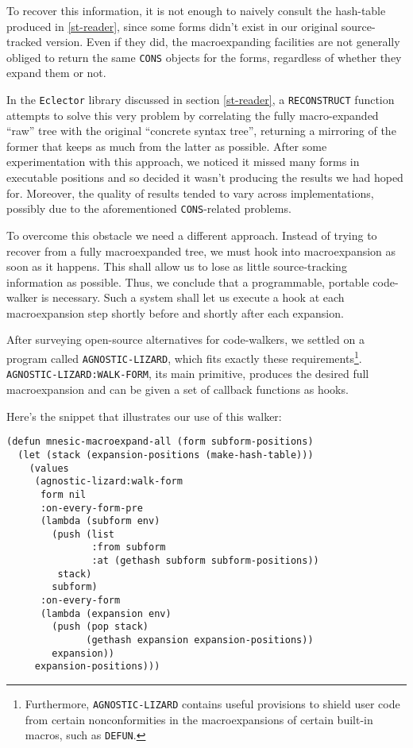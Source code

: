 \documentclass[format=sigconf]{acmart}
\begin{document}
To recover this information, it is not enough to naively consult the
hash-table produced in \ref{st-reader}, since some forms didn't exist
in our original source-tracked version.  Even if they did, the
macroexpanding facilities are not generally obliged to return the same
\texttt{CONS} objects for the forms, regardless of whether they expand
them or not.

In the \texttt{Eclector} library discussed in section \ref{st-reader},
a \texttt{RECONSTRUCT} function attempts to solve this very problem by
correlating the fully macro-expanded ``raw'' tree with the original
``concrete syntax tree'', returning a mirroring of the former that
keeps as much from the latter as possible.  After some experimentation
with this approach, we noticed it missed many forms in executable
positions and so decided it wasn't producing the results we had hoped
for.  Moreover, the quality of results tended to vary across
implementations, possibly due to the aforementioned
\texttt{CONS}-related problems.

To overcome this obstacle we need a different approach.  Instead of
trying to recover from a fully macroexpanded tree, we must hook into
macroexpansion as soon as it happens.  This shall allow us to lose as
little source-tracking information as possible.  Thus, we conclude
that a programmable, portable code-walker is necessary.  Such a system
shall let us execute a hook at each macroexpansion step shortly before
and shortly after each expansion.

After surveying open-source alternatives for code-walkers, we settled
on a program called \texttt{AGNOSTIC-LIZARD}\cite{agnostic-lizard},
which fits exactly these requirements\footnote{Furthermore,
  \texttt{AGNOSTIC-LIZARD} contains useful provisions to shield user
  code from certain nonconformities in the macroexpansions of certain
  built-in macros, such as \texttt{DEFUN}.}.
\texttt{AGNOSTIC-LIZARD:WALK-FORM}, its main primitive, produces the
desired full macroexpansion and can be given a set of callback
functions as hooks.

Here's the snippet that illustrates our use of this walker:

\begin{verbatim}
(defun mnesic-macroexpand-all (form subform-positions)
  (let (stack (expansion-positions (make-hash-table)))
    (values
     (agnostic-lizard:walk-form
      form nil
      :on-every-form-pre
      (lambda (subform env)
        (push (list
               :from subform
               :at (gethash subform subform-positions))
         stack)
        subform)
      :on-every-form
      (lambda (expansion env)
        (push (pop stack)
              (gethash expansion expansion-positions))
        expansion))
     expansion-positions)))
\end{verbatim}
\end{document}

